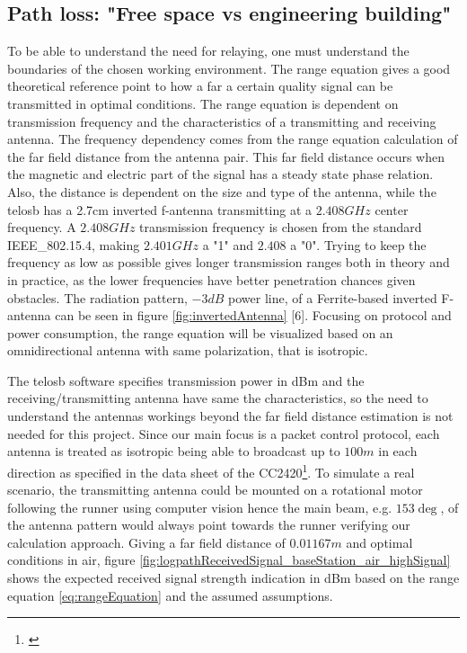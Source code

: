 \subsection{Path loss: "Free space vs engineering building"}\label{sc:pathLoss}

To be able to understand the need for relaying, one must understand the boundaries of the chosen working environment. The range equation gives a good theoretical reference point to how a far a certain quality signal can be transmitted in optimal conditions. The range equation is dependent on transmission frequency and the characteristics of a transmitting and receiving antenna. The frequency dependency comes from the range equation calculation of the far field distance from the antenna pair. This far field distance occurs when the magnetic and electric part of the signal has a steady state phase relation. Also, the distance is dependent on the size and type of the antenna, while the telosb has a 2.7cm inverted f-antenna transmitting at a $2.408GHz$ center frequency. A $2.408GHz$ transmission frequency is chosen from the standard IEEE\_802.15.4, making $2.401GHz$ a "1" and $2.408$ a "0". Trying to keep the frequency as low as possible gives longer transmission ranges both in theory and in practice, as the lower frequencies have better penetration chances given obstacles. The radiation pattern, $-3dB$ power line, of a Ferrite-based inverted F-antenna can be seen in figure \ref{fig:invertedAntenna} [6]. Focusing on protocol and power consumption, the range equation will be visualized based on an omnidirectional antenna with same polarization, that is isotropic.

\noindent The telosb software specifies transmission power in dBm and the receiving/transmitting antenna have same the characteristics, so the need to understand the antennas workings beyond the far field distance estimation is not needed for this project. Since our main focus is a packet control protocol, each antenna is treated as isotropic being able to broadcast up to $100m$ in each direction as specified in the data sheet of the CC2420\footnote{\cite{Ieee}}. To simulate a real scenario, the transmitting antenna could be mounted on a rotational motor following the runner using computer vision hence the main beam, e.g. $153\deg$, of the antenna pattern would always point towards the runner verifying our calculation approach. Giving a far field distance of $0.01167m$ and optimal conditions in air, figure \ref{fig:logpathReceivedSignal_baseStation_air_highSignal} shows the expected received signal strength indication in dBm based on the range equation \ref{eq:rangeEquation} and the assumed assumptions.

